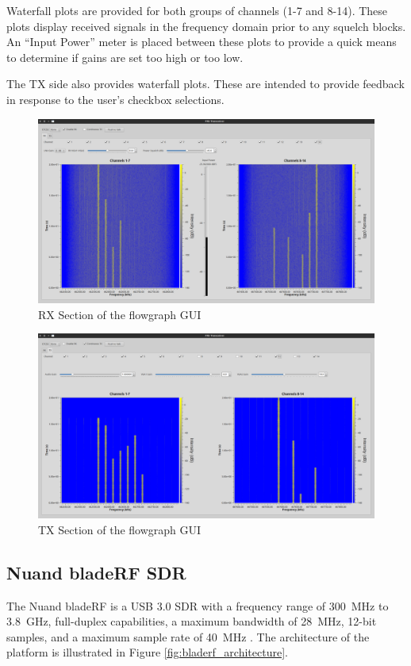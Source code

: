Waterfall plots are provided for both groups of channels (1-7 and 8-14). These plots
display received signals in the frequency domain prior to any squelch blocks.
An ``Input Power'' meter is placed between these plots to provide a quick means
to determine if gains are set too high or too low.

The \ac{TX} side also provides waterfall plots. These are intended to provide
feedback in response to the user's checkbox selections.

\begin{figure}[H]
  \centering
  \includegraphics[width=6.5in]{images/frs/gui_rx.png}
  \caption{RX Section of the flowgraph GUI}
  \label{fig:gui_rx}
\end{figure}

\begin{figure}[H]
  \centering
  \includegraphics[width=6.5in]{images/frs/gui_tx.png}
  \caption{TX Section of the flowgraph GUI}
  \label{fig:gui_tx}
\end{figure}

\subsection{Nuand bladeRF SDR}
The Nuand bladeRF is a USB 3.0 \ac{SDR} with a frequency
range of 300~MHz to 3.8~GHz, full-duplex capabilities, a maximum bandwidth of
28~MHz, 12-bit samples, and a maximum sample rate of 40~MHz
\cite{BLADERF_BRIEF}. The architecture of the platform is illustrated in
Figure \ref{fig:bladerf_architecture}.

